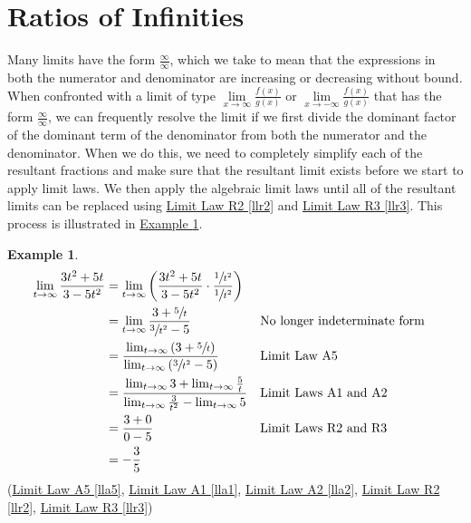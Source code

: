 \documentclass[10pt,oneside,]{book}
\theoremstyle{plain}
\theoremstyle{definition}
\newtheorem{example}[theorem]{Example}
\numberwithin{equation}{section}
\newcommand{\fe}[2]{#1\mathopen{}\left(#2\right)\mathclose{}}
\begin{document}
\section[Ratios of Infinities]{Ratios of Infinities}\label{section-ratios-of-infinities}
Many limits have the form \(\frac{\infty}{\infty}\), which we take to mean that the expressions in both the numerator and denominator are increasing or decreasing without bound. When confronted with a limit of type \(\lim\limits_{x\to\infty}\frac{\fe{f}{x}}{\fe{g}{x}}\) or \(\lim\limits_{x\to-\infty}\frac{\fe{f}{x}}{\fe{g}{x}}\) that has the form \(\frac{\infty}{\infty}\), we can frequently resolve the limit if we first divide the dominant factor of the dominant term of the denominator from both the numerator and the denominator. When we do this, we need to completely simplify each of the resultant fractions and make sure that the resultant limit exists before we start to apply limit laws. We then apply the algebraic limit laws until all of the resultant limits can be replaced using \hyperref[llr2]{Limit Law R2 \ref{llr2}} and \hyperref[llr3]{Limit Law R3 \ref{llr3}}. This process is illustrated in \hyperref[example-ratio-of-infinities]{Example \ref{example-ratio-of-infinities}}.%
\begin{example}\label{example-ratio-of-infinities}
\begin{align*}
\lim_{t\to\infty}\frac{3t^2+5t}{3-5t^2}&=\lim_{t\to\infty}\left(\frac{3t^2+5t}{3-5t^2}\cdot\frac{\sfrac{1}{t^2}}{\sfrac{1}{t^2}}\right)\\
&=\lim_{t\to\infty}\frac{3+\sfrac{5}{t}}{\sfrac{3}{t^2}-5}&&\text{No longer indeterminate form}\\
&=\frac{\lim_{t\to\infty}\left(3+\sfrac{5}{t}\right)}{\lim_{t\to\infty}\left(\sfrac{3}{t^2}-5\right)}&&\text{Limit Law A5}\\
&=\frac{\lim_{t\to\infty}3+\lim_{t\to\infty}\frac{5}{t}}{\lim_{t\to\infty}\frac{3}{t^2}-\lim_{t\to\infty}5}&&\text{Limit Laws A1 and A2}\\
&=\frac{3+0}{0-5}&&\text{Limit Laws R2 and R3}\\
&=-\frac{3}{5}
\end{align*}(\hyperref[lla5]{Limit Law A5 \ref{lla5}}, \hyperref[lla1]{Limit Law A1 \ref{lla1}}, \hyperref[lla2]{Limit Law A2 \ref{lla2}}, \hyperref[llr2]{Limit Law R2 \ref{llr2}}, \hyperref[llr3]{Limit Law R3 \ref{llr3}})%
\end{example}
\typeout{************************************************}
\typeout{************************************************}
\end{document}

